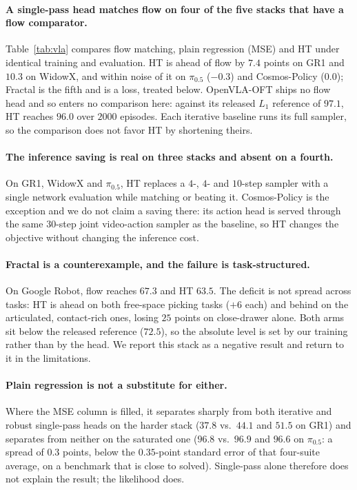 \paragraph{A single-pass head matches flow on four of the five stacks that have
a flow comparator.} Table~\ref{tab:vla} compares flow matching, plain regression
(MSE) and HT under identical training and evaluation. HT is ahead of flow by
$7.4$ points on GR1 and $10.3$ on WidowX, and within noise of it on $\pi_{0.5}$
($-0.3$) and Cosmos-Policy ($0.0$); Fractal is the fifth and is a loss, treated
below. OpenVLA-OFT ships no flow head and so enters no comparison here: against
its released $L_1$ reference of $97.1$, HT reaches $96.0$ over $2000$ episodes.
Each iterative baseline runs its full sampler, so the comparison does not favor
HT by shortening theirs.

\paragraph{The inference saving is real on three stacks and absent on a fourth.}
On GR1, WidowX and $\pi_{0.5}$, HT replaces a $4$-, $4$- and $10$-step sampler
with a single network evaluation while matching or beating it. Cosmos-Policy is the
exception and we do not claim a saving there: its action head is served through
the same $30$-step joint video-action sampler as the baseline, so HT changes the
objective without changing the inference cost.

\paragraph{Fractal is a counterexample, and the failure is task-structured.}
On Google Robot, flow reaches $67.3$ and HT $63.5$. The deficit is not spread
across tasks: HT is ahead on both free-space picking tasks ($+6$ each) and
behind on the articulated, contact-rich ones, losing $25$ points on
close-drawer alone. Both arms sit below the released reference ($72.5$), so the
absolute level is set by our training rather than by the head. We report this
stack as a negative result and return to it in the limitations.

\paragraph{Plain regression is not a substitute for either.} Where the MSE
column is filled, it separates sharply from both iterative and robust
single-pass heads on the harder stack ($37.8$ vs.\ $44.1$ and $51.5$ on GR1)
and separates from neither on the saturated one ($96.8$ vs.\ $96.9$ and
$96.6$ on $\pi_{0.5}$: a spread of $0.3$ points, below the $0.35$-point standard
error of that four-suite average, on a benchmark that is close to solved). Single-pass alone therefore does not explain the
result; the likelihood does.

